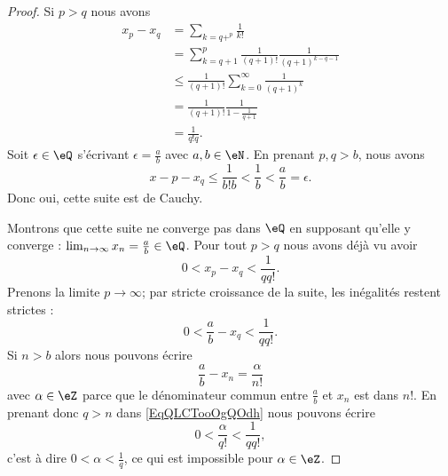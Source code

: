 \begin{proof}
    Si \( p>q\) nous avons
    \begin{subequations}
        \begin{align}
            x_p-x_q&=\sum_{k=q+^p}\frac{1}{ k! }\\
            &=\sum_{k=q+1}^p\frac{1}{ (q+1)! }\frac{1}{ (q+1)^{k-q-1} }\\
            &\leq \frac{1}{ (q+1)! }\sum_{k=0}^{\infty}\frac{1}{ (q+1)^k }\\
            &=\frac{1}{ (q+1)! }\frac{1}{ 1-\frac{1}{ q+1 } }\\
            &=\frac{1}{ q!q }.
        \end{align}
    \end{subequations}
    Soit \( \epsilon\in\eQ\) s'écrivant \( \epsilon=\frac{ a }{ b }\) avec \( a,b\in \eN\). En prenant \( p,q>b\), nous avons
    \begin{equation}
        x-p-x_q\leq \frac{1}{ b!b }<\frac{1}{ b }<\frac{ a }{ b }=\epsilon.
    \end{equation}
    Donc oui, cette suite est de Cauchy. 

    Montrons que cette suite ne converge pas dans \( \eQ\) en supposant qu'elle y converge : \( \lim_{n\to \infty} x_n=\frac{ a }{b }\in \eQ\). Pour tout \( p>q\) nous avons déjà vu avoir
    \begin{equation}
        0<x_p-x_q<\frac{1}{ qq! }.
    \end{equation}
    Prenons la limite \( p\to \infty\); par stricte croissance de la suite, les inégalités restent strictes :
    \begin{equation}        \label{EqQLCTooOgQOdh}
        0<\frac{ a }{ b }-x_q<\frac{1}{ qq! }.
    \end{equation}
    Si \( n>b\) alors nous pouvons écrire
    \begin{equation}
        \frac{ a }{ b }-x_n=\frac{ \alpha }{ n! }
    \end{equation}
    avec \( \alpha\in \eZ\) parce que le dénominateur commun entre \( \frac{ a }{ b }\) et \( x_n\) est dans \( n!\). En prenant donc \( q>n\) dans \eqref{EqQLCTooOgQOdh} nous pouvons écrire
    \begin{equation}
        0<\frac{ \alpha }{ q! }<\frac{1}{ qq! },
    \end{equation}
    c'est à dire \( 0<\alpha<\frac{1}{ q }\), ce qui est impossible pour \( \alpha\in \eZ\).
\end{proof}

